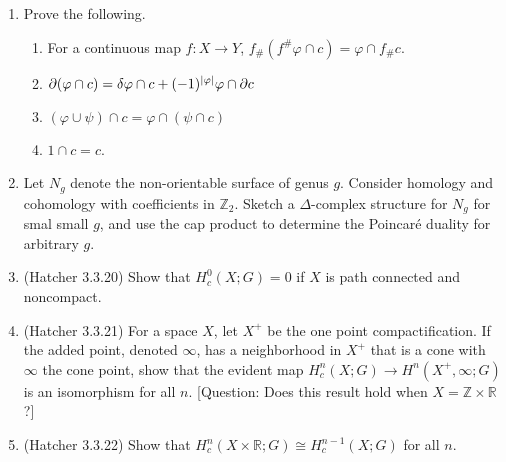 \documentclass[11pt]{article}
\begin{document}
\begin{enumerate}
    \item Prove the following.\begin{enumerate}
        \item For a continuous map $f\colon X\to Y$, $f_{\#}(f^{\#}\varphi\cap c) = \varphi\cap f_{\#}c$.
        \item $\partial(\varphi\cap c) = \delta\varphi\cap c + (-1)^{\abs{\varphi}}\varphi\cap \partial c$
        \item $(\varphi\cup \psi)\cap c = \varphi\cap (\psi\cap c)$
        \item $1\cap c = c$.
    \end{enumerate}
    \item Let $N_g$ denote the non-orientable surface of genus $g$. Consider homology and cohomology with coefficients in $\mathbb{Z}_2$. Sketch a $\Delta$-complex structure for $N_g$ for smal small $g$, and use the cap product to determine the Poincar\'e duality for arbitrary $g$.
    \item (Hatcher 3.3.20) Show that $H^0_c(X;G)=0$ if $X$ is path connected and noncompact.
    \item (Hatcher 3.3.21) For a space $X$, let $X^+$ be the one point compactification. If the added point, denoted $\infty$, has a neighborhood in $X^+$ that is a cone with $\infty$ the cone point, show that the evident map $H^n_c(X;G)\to H^n(X^+,\infty;G)$ is an isomorphism for all $n$. [Question: Does this result hold when $X = \mathbb{Z}\times \mathbb{R}$?]
    \item (Hatcher 3.3.22) Show that $H^n_c(X\times\mathbb{R};G)\cong H^{n-1}_c(X;G)$ for all $n$.
\end{enumerate}
\end{document}
